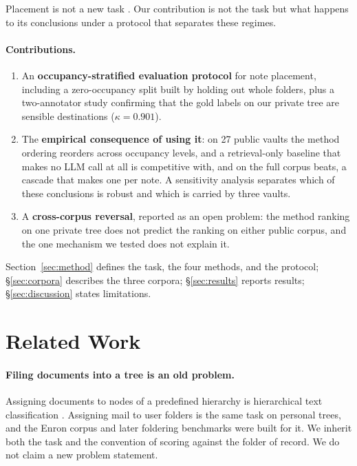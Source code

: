 \documentclass[11pt]{article}
\begin{document}
Placement is not a new task \citep{koller1997,klimt2004enron,paperrouter}.
Our contribution is not the task but what happens to its conclusions under a protocol that separates these regimes.

\paragraph{Contributions.}
\begin{enumerate}[itemsep=2pt,topsep=3pt]
  \item An \textbf{occupancy-stratified evaluation protocol} for note placement, including a zero-occupancy split built by holding out whole folders, plus a two-annotator study confirming that the gold labels on our private tree are sensible destinations ($\kappa{=}0.901$).
  \item The \textbf{empirical consequence of using it}: on 27 public vaults the method ordering reorders across occupancy levels, and a retrieval-only baseline that makes no LLM call at all is competitive with, and on the full corpus beats, a cascade that makes one per note. A sensitivity analysis separates which of these conclusions is robust and which is carried by three vaults.
  \item A \textbf{cross-corpus reversal}, reported as an open problem: the method ranking on one private tree does not predict the ranking on either public corpus, and the one mechanism we tested does not explain it.
\end{enumerate}

Section~\ref{sec:method} defines the task, the four methods, and the protocol; \S\ref{sec:corpora} describes the three corpora; \S\ref{sec:results} reports results; \S\ref{sec:discussion} states limitations.

\section{Related Work}

\paragraph{Filing documents into a tree is an old problem.}
Assigning documents to nodes of a predefined hierarchy is hierarchical text classification \citep{koller1997,silla2011,zhou2020hiagm}.
Assigning mail to user folders is the same task on personal trees, and the Enron corpus \citep{klimt2004enron} and later foldering benchmarks \citep{bekkerman2004foldering} were built for it.
We inherit both the task and the convention of scoring against the folder of record.
We do not claim a new problem statement.
\end{document}
